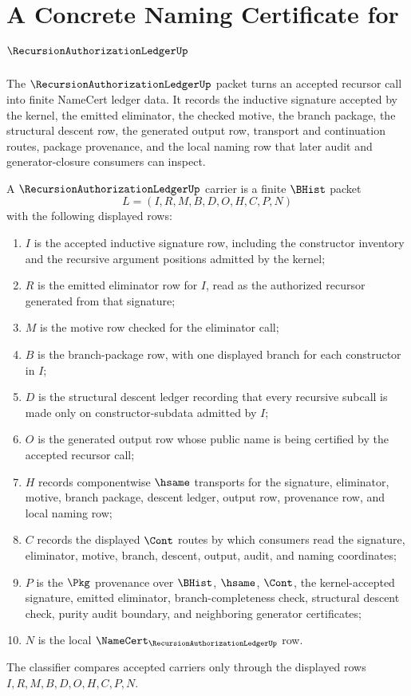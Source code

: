 \chapter{A Concrete Naming Certificate for $\RecursionAuthorizationLedgerUp$}
\label{ch:concrete-instances-recursion-authorization-ledger-namecert}

The $\RecursionAuthorizationLedgerUp$ packet turns an accepted recursor call into finite NameCert ledger data. It records the inductive signature accepted by the kernel, the emitted eliminator, the checked motive, the branch package, the structural descent row, the generated output row, transport and continuation routes, package provenance, and the local naming row that later audit and generator-closure consumers can inspect.

\begin{definition}
\label{def:recursion-authorization-ledger-carrier}
A $\RecursionAuthorizationLedgerUp$ carrier is a finite $\BHist$ packet
$$
L=(I,R,M,B,D,O,H,C,P,N)
$$
with the following displayed rows:
\begin{enumerate}
\item $I$ is the accepted inductive signature row, including the constructor inventory and the recursive argument positions admitted by the kernel;
\item $R$ is the emitted eliminator row for $I$, read as the authorized recursor generated from that signature;
\item $M$ is the motive row checked for the eliminator call;
\item $B$ is the branch-package row, with one displayed branch for each constructor in $I$;
\item $D$ is the structural descent ledger recording that every recursive subcall is made only on constructor-subdata admitted by $I$;
\item $O$ is the generated output row whose public name is being certified by the accepted recursor call;
\item $H$ records componentwise $\hsame$ transports for the signature, eliminator, motive, branch package, descent ledger, output row, provenance row, and local naming row;
\item $C$ records the displayed $\Cont$ routes by which consumers read the signature, eliminator, motive, branch, descent, output, audit, and naming coordinates;
\item $P$ is the $\Pkg$ provenance over $\BHist$, $\hsame$, $\Cont$, the kernel-accepted signature, emitted eliminator, branch-completeness check, structural descent check, purity audit boundary, and neighboring generator certificates;
\item $N$ is the local $\NameCert_{\RecursionAuthorizationLedgerUp}$ row.
\end{enumerate}
The classifier compares accepted carriers only through the displayed rows $I,R,M,B,D,O,H,C,P,N$.
\end{definition}


